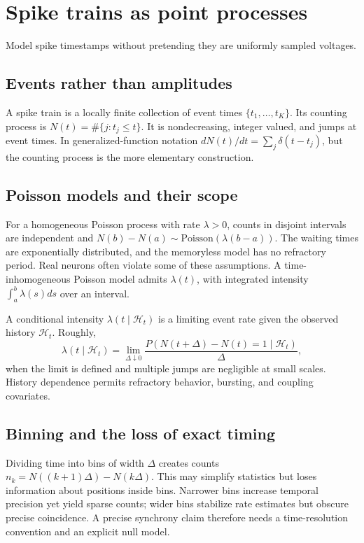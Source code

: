 \chapter{Spike trains as point processes}\label{ch:points}
\begin{readergoal}Model spike timestamps without pretending they are uniformly sampled voltages.\end{readergoal}
\section{Events rather than amplitudes}
A spike train is a locally finite collection of event times $\{t_1,\ldots,t_K\}$. Its counting process is $N(t)=\#\{j:t_j\le t\}$. It is nondecreasing, integer valued, and jumps at event times. In generalized-function notation $dN(t)/dt=\sum_j\delta(t-t_j)$, but the counting process is the more elementary construction.

\section{Poisson models and their scope}
For a homogeneous Poisson process with rate $\lambda>0$, counts in disjoint intervals are independent and $N(b)-N(a)\sim\mathrm{Poisson}(\lambda(b-a))$. The waiting times are exponentially distributed, and the memoryless model has no refractory period. Real neurons often violate some of these assumptions. A time-inhomogeneous Poisson model admits $\lambda(t)$, with integrated intensity $\int_a^b\lambda(s)ds$ over an interval.

A conditional intensity $\lambda(t\mid\mathcal H_t)$ is a limiting event rate given the observed history $\mathcal H_t$. Roughly,
\[\lambda(t\mid\mathcal H_t)=\lim_{\Delta\downarrow0}\frac{P(N(t+\Delta)-N(t)=1\mid\mathcal H_t)}{\Delta},\]
when the limit is defined and multiple jumps are negligible at small scales. History dependence permits refractory behavior, bursting, and coupling covariates.

\section{Binning and the loss of exact timing}
Dividing time into bins of width $\Delta$ creates counts $n_k=N((k+1)\Delta)-N(k\Delta)$. This may simplify statistics but loses information about positions inside bins. Narrower bins increase temporal precision yet yield sparse counts; wider bins stabilize rate estimates but obscure precise coincidence. A precise synchrony claim therefore needs a time-resolution convention and an explicit null model.

